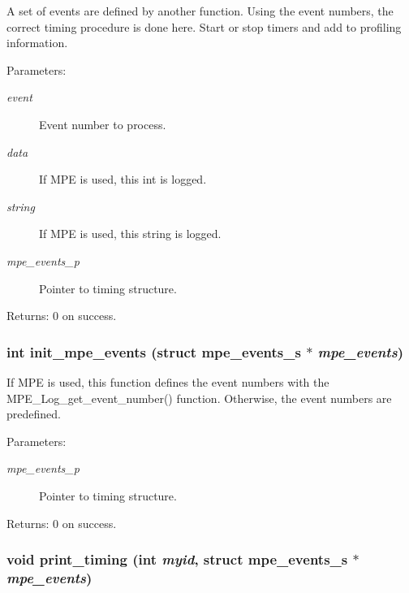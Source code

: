 A set of events are defined by another function. Using the event numbers, the correct timing procedure is done here. Start or stop timers and add to profiling information.

\begin{Desc}
\item[Parameters:]
\begin{description}
\item[{\em event}]Event number to process. \item[{\em data}]If MPE is used, this int is logged. \item[{\em string}]If MPE is used, this string is logged. \item[{\em mpe\_\-events\_\-p}]Pointer to timing structure. \end{description}
\end{Desc}
\begin{Desc}
\item[Returns:]0 on success. \end{Desc}
\subsubsection{\setlength{\rightskip}{0pt plus 5cm}int init\_\-mpe\_\-events (struct \bf{mpe\_\-events\_\-s} $\ast$ {\em mpe\_\-events})}\label{mpe__init_8c_96fb9612d0256b13c9d195ff01412f41}


If MPE is used, this function defines the event numbers with the MPE\_\-Log\_\-get\_\-event\_\-number() function. Otherwise, the event numbers are predefined.

\begin{Desc}
\item[Parameters:]
\begin{description}
\item[{\em mpe\_\-events\_\-p}]Pointer to timing structure. \end{description}
\end{Desc}
\begin{Desc}
\item[Returns:]0 on success. \end{Desc}
\subsubsection{\setlength{\rightskip}{0pt plus 5cm}void print\_\-timing (int {\em myid}, struct \bf{mpe\_\-events\_\-s} $\ast$ {\em mpe\_\-events})}\label{mpe__init_8c_7c07a6204913a60e91dd3d81e8a970c3}


